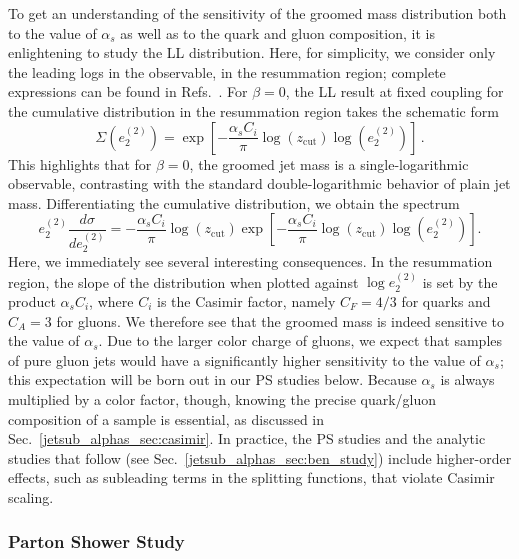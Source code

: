 \documentclass[11pt]{cernrep}
\begin{document}
To get an understanding of the sensitivity of the groomed mass distribution both to the value of $\alpha_s$ as well as to the quark and gluon composition, it is enlightening to study the LL distribution.
%
Here, for simplicity, we consider only the leading logs in the observable, in the resummation region; complete expressions can be found in Refs.~\cite{Larkoski:2014wba,Frye:2016aiz,Marzani:2017mva,Marzani:2017kqd}.
%
For $\beta=0$, the LL result at fixed coupling for the cumulative distribution in the resummation region takes the schematic form
%
\begin{equation}
\Sigma(e_2^{(2)})=\exp\left[ - \frac{\alpha_s C_i}{\pi} \log(z_{\mathrm{cut}} ) \log (e_2^{(2)}) \right]\,.
\end{equation}
%
This highlights that for $\beta=0$, the groomed jet mass is a single-logarithmic observable, contrasting with the standard double-logarithmic behavior of plain jet mass.
%
Differentiating the cumulative distribution, we obtain the spectrum
%
\begin{equation}
\label{jetsub_alphas_eq:ecf_ll_dsitribution}
e_2^{(2)} \frac{d\sigma}{d e_2^{(2)}}=   - \frac{\alpha_s C_i}{\pi} \log(z_{\mathrm{cut}} )   \exp\left[ - \frac{\alpha_s C_i}{\pi}  \log(z_{\mathrm{cut}} ) \log (e_2^{(2)}) \right].
\end{equation}
%
Here, we immediately see several interesting consequences.
%
In the resummation region, the slope of the distribution when plotted against $\log e_2^{(2)}$ is set by the product $\alpha_s C_i$, where $C_i$ is the Casimir factor, namely $C_F = 4/3$ for quarks and $C_A = 3$ for gluons.
%
We therefore see that the groomed mass is indeed sensitive to the value of $\alpha_s$.
%
Due to the larger color charge of gluons, we expect that samples of pure gluon jets would have a significantly higher sensitivity to the value of $\alpha_s$; this expectation will be born out in our PS studies below.
%
Because $\alpha_s$ is always multiplied by a color factor, though, knowing the precise quark/gluon composition of a sample is essential, as discussed in Sec.~\ref{jetsub_alphas_sec:casimir}.
%
In practice, the PS studies and the analytic studies that follow (see Sec.~\ref{jetsub_alphas_sec:ben_study}) include higher-order effects, such as subleading terms in the splitting functions, that violate Casimir scaling.

\subsubsection{Parton Shower Study}
\end{document}
